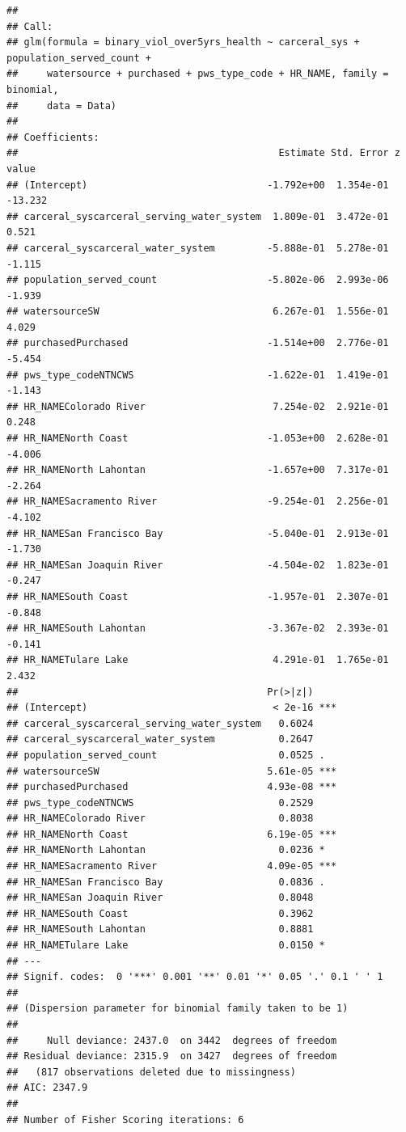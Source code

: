 \documentclass[
]{article}
\begin{document}
\begin{verbatim}
## 
## Call:
## glm(formula = binary_viol_over5yrs_health ~ carceral_sys + population_served_count + 
##     watersource + purchased + pws_type_code + HR_NAME, family = binomial, 
##     data = Data)
## 
## Coefficients:
##                                             Estimate Std. Error z value
## (Intercept)                               -1.792e+00  1.354e-01 -13.232
## carceral_syscarceral_serving_water_system  1.809e-01  3.472e-01   0.521
## carceral_syscarceral_water_system         -5.888e-01  5.278e-01  -1.115
## population_served_count                   -5.802e-06  2.993e-06  -1.939
## watersourceSW                              6.267e-01  1.556e-01   4.029
## purchasedPurchased                        -1.514e+00  2.776e-01  -5.454
## pws_type_codeNTNCWS                       -1.622e-01  1.419e-01  -1.143
## HR_NAMEColorado River                      7.254e-02  2.921e-01   0.248
## HR_NAMENorth Coast                        -1.053e+00  2.628e-01  -4.006
## HR_NAMENorth Lahontan                     -1.657e+00  7.317e-01  -2.264
## HR_NAMESacramento River                   -9.254e-01  2.256e-01  -4.102
## HR_NAMESan Francisco Bay                  -5.040e-01  2.913e-01  -1.730
## HR_NAMESan Joaquin River                  -4.504e-02  1.823e-01  -0.247
## HR_NAMESouth Coast                        -1.957e-01  2.307e-01  -0.848
## HR_NAMESouth Lahontan                     -3.367e-02  2.393e-01  -0.141
## HR_NAMETulare Lake                         4.291e-01  1.765e-01   2.432
##                                           Pr(>|z|)    
## (Intercept)                                < 2e-16 ***
## carceral_syscarceral_serving_water_system   0.6024    
## carceral_syscarceral_water_system           0.2647    
## population_served_count                     0.0525 .  
## watersourceSW                             5.61e-05 ***
## purchasedPurchased                        4.93e-08 ***
## pws_type_codeNTNCWS                         0.2529    
## HR_NAMEColorado River                       0.8038    
## HR_NAMENorth Coast                        6.19e-05 ***
## HR_NAMENorth Lahontan                       0.0236 *  
## HR_NAMESacramento River                   4.09e-05 ***
## HR_NAMESan Francisco Bay                    0.0836 .  
## HR_NAMESan Joaquin River                    0.8048    
## HR_NAMESouth Coast                          0.3962    
## HR_NAMESouth Lahontan                       0.8881    
## HR_NAMETulare Lake                          0.0150 *  
## ---
## Signif. codes:  0 '***' 0.001 '**' 0.01 '*' 0.05 '.' 0.1 ' ' 1
## 
## (Dispersion parameter for binomial family taken to be 1)
## 
##     Null deviance: 2437.0  on 3442  degrees of freedom
## Residual deviance: 2315.9  on 3427  degrees of freedom
##   (817 observations deleted due to missingness)
## AIC: 2347.9
## 
## Number of Fisher Scoring iterations: 6
\end{verbatim}
\end{document}
